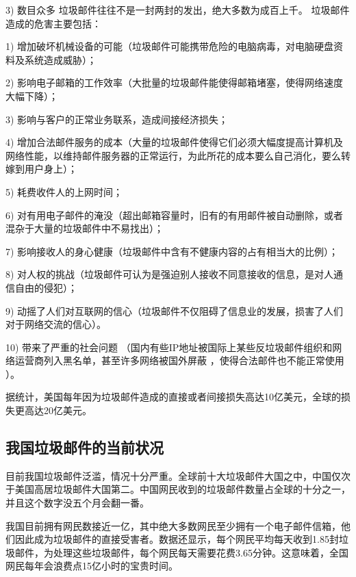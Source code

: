              3)  数目众多  垃圾邮件往往不是一封两封的发出，绝大多数为成百上千。 垃圾邮件造成的危害主要包括：  
             
             1) 增加破坏机械设备的可能（垃圾邮件可能携带危险的电脑病毒，对电脑硬盘资 料及系统造成威胁）； 
             
              2)  影响电子邮箱的工作效率（大批量的垃圾邮件能使得邮箱堵塞，使得网络速度大幅下降）；
              
                3) 影响与客户的正常业务联系，造成间接经济损失；  
                
                4) 增加合法邮件服务的成本（大量的垃圾邮件使得它们必须大幅度提高计算机及网络性能，以维持邮件服务器的正常运行，为此所花的成本要么自己消化，要么转嫁到用户身上）； 
                
                 5)   耗费收件人的上网时间；  
                 
                 6) 对有用电子邮件的淹没（超出邮箱容量时，旧有的有用邮件被自动删除，或者混杂于大量的垃圾邮件中不易找出）； 
                 
                  7) 影响接收人的身心健康（垃圾邮件中含有不健康内容的占有相当大的比例）；
                  
                   8) 对人权的挑战（垃圾邮件可认为是强迫别人接收不同意接收的信息，是对人通信自由的侵犯）； 
                   
                    9) 动摇了人们对互联网的信心（垃圾邮件不仅阻碍了信息业的发展，损害了人们对于网络交流的信心）。 
                    
                     10) 带来了严重的社会问题 （国内有些IP地址被国际上某些反垃圾邮件组织和网络运营商列入黑名单，甚至许多网络被国外屏蔽 ，使得合法邮件也不能正常使用 ）。 
                     
                      据统计，美国每年因为垃圾邮件造成的直接或者间接损失高达10亿美元，全球的损失更高达20亿美元。
\subsection{我国垃圾邮件的当前状况}
目前我国垃圾邮件泛滥，情况十分严重。全球前十大垃圾邮件大国之中，中国仅次于美国高居垃圾邮件大国第二。中国网民收到的垃圾邮件数量占全球的十分之一，并且这个数字没五个月会翻一番。

我国目前拥有网民数接近一亿，其中绝大多数网民至少拥有一个电子邮件信箱，他们因此成为垃圾邮件的直接受害者。数据还显示，每个网民平均每天收到1.85封垃圾邮件，为处理这些垃圾邮件，每个网民每天需要花费3.65分钟。这意味着，全国网民每年会浪费点15亿小时的宝贵时间。  

